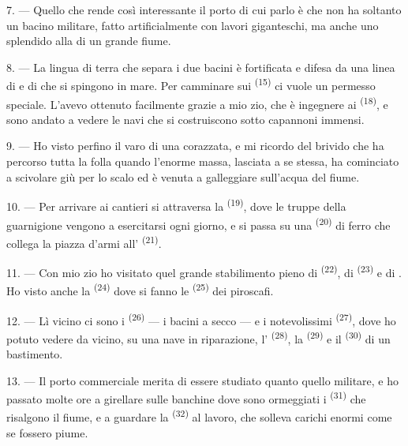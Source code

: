 \VUsaut{3.0mm}
\VUsaut{3.0mm}

7. --- Quello che rende così interessante il porto di cui parlo è che non ha soltanto
un bacino militare, fatto artificialmente con lavori giganteschi, ma anche uno
splendido  alla  di un grande fiume.

8. --- La lingua di terra che separa i due bacini è fortificata e difesa da una linea
di  e di  che si spingono in mare. Per camminare
sui  \textsuperscript{(15)} ci vuole un permesso speciale. L'avevo
ottenuto facilmente grazie a mio zio, che è ingegnere ai 
\textsuperscript{(18)}, e sono andato a vedere le navi che si costruiscono sotto
capannoni immensi.

9. --- Ho visto perfino il varo di una corazzata, e mi ricordo del brivido che ha
percorso tutta la folla quando l'enorme massa, lasciata a se stessa, ha cominciato a
scivolare giù per lo scalo ed è venuta a galleggiare sull'acqua del fiume.

10. --- Per arrivare ai cantieri si attraversa la 
\textsuperscript{(19)}, dove le truppe della guarnigione vengono a esercitarsi ogni
giorno, e si passa su una  \textsuperscript{(20)} di ferro che
collega la piazza d'armi all' \textsuperscript{(21)}.

\VUsaut{3.0mm}
\VUsaut{3.0mm}

11. --- Con mio zio ho visitato quel grande stabilimento pieno di 
\textsuperscript{(22)}, di  \textsuperscript{(23)} e di
. Ho visto anche la  \textsuperscript{(24)} dove si
fanno le  \textsuperscript{(25)} dei piroscafi.

12. --- Lì vicino ci sono i  \textsuperscript{(26)} --- i
bacini a secco --- e i notevolissimi 
\textsuperscript{(27)}, dove ho potuto vedere da vicino, su una nave in riparazione,
l' \textsuperscript{(28)}, la  \textsuperscript{(29)} e
il  \textsuperscript{(30)} di un bastimento.

13. --- Il porto commerciale merita di essere studiato quanto quello militare, e ho
passato molte ore a girellare sulle banchine dove sono ormeggiati i  \textsuperscript{(31)} che risalgono il fiume, e a guardare la  \textsuperscript{(32)} al lavoro, che solleva carichi enormi come se fossero
piume.

